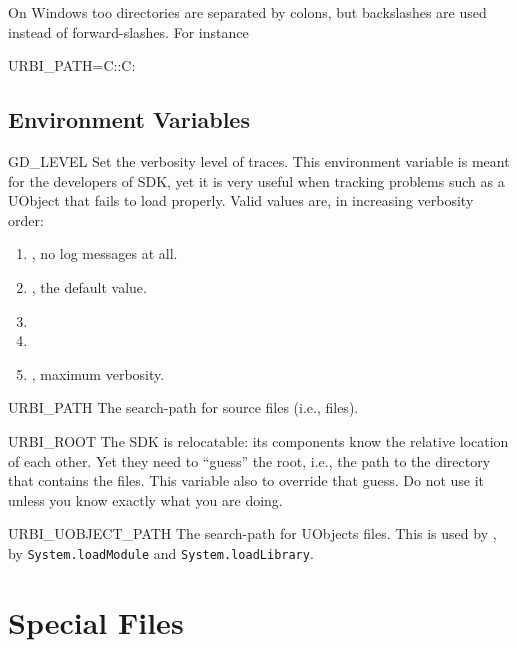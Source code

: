 \begin{windows}
  On Windows too directories are separated by colons, but backslashes
  are used instead of forward-slashes.  For instance
\begin{shell}
URBI_PATH=C:\cygwin\home\jessie\urbi:C:\cygwin\usr\local\urbi
\end{shell}
\end{windows}

\subsection{Environment Variables}
\label{sec:tools:env}
\begin{envs}
\item[GD\_LEVEL] Set the verbosity level of traces.  This environment
  variable is meant for the developers of \urbi SDK, yet it is very useful
  when tracking problems such as a UObject that fails to load properly.
  Valid values are, in increasing verbosity order:
  \begin{enumerate}
  \item {}, no log messages at all.
  \item {}, the default value.
  \item {}
  \item {}
  \item {}, maximum verbosity.
  \end{enumerate}

\item[URBI\_PATH] The search-path for \us source files (i.e.,
   files).

\item[URBI\_ROOT] The \urbi SDK is relocatable: its components know the
  relative location of each other.  Yet they need to ``guess'' the
  \urbi root, i.e., the path to the directory that contains the files.
  This variable also to override that guess.  Do not use it unless you
  know exactly what you are doing.

\item[URBI\_UOBJECT\_PATH] The search-path for UObjects files.
  This is used by , by
  \lstinline|System.loadModule| and \lstinline|System.loadLibrary|.
\end{envs}

\section{Special Files}
\label{sec:tools:files}

